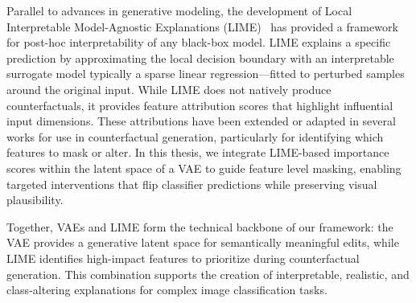 Parallel to advances in generative modeling, the development of Local Interpretable Model-Agnostic Explanations (LIME)~\cite{Ribeiro2018} has provided a framework for post-hoc interpretability of any black-box model. LIME explains a specific prediction by approximating the local decision boundary with an interpretable surrogate model typically a sparse linear regression—fitted to perturbed samples around the original input. While LIME does not natively produce counterfactuals, it provides feature attribution scores that highlight influential input dimensions. These attributions have been extended or adapted in several works for use in counterfactual generation, particularly for identifying which features to mask or alter. In this thesis, we integrate LIME-based importance scores within the latent space of a VAE to guide feature level masking, enabling targeted interventions that flip classifier predictions while preserving visual plausibility.

Together, VAEs and LIME form the technical backbone of our framework: the VAE provides a generative latent space for semantically meaningful edits, while LIME identifies high-impact features to prioritize during counterfactual generation. This combination supports the creation of interpretable, realistic, and class-altering explanations for complex image classification tasks.






